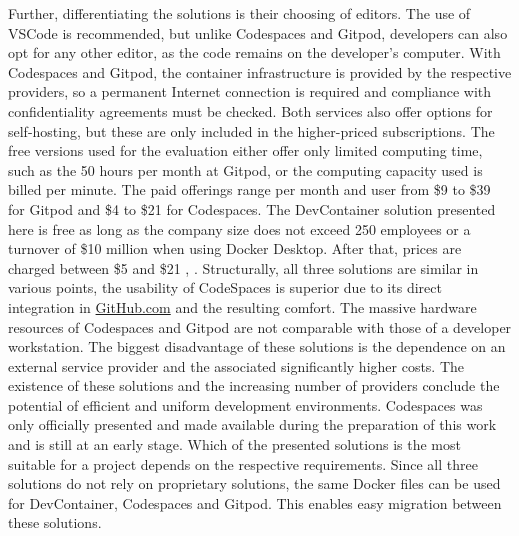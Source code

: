         Further, differentiating the solutions is their choosing of editors. The use of \ac{VSCode} is recommended, but unlike Codespaces and Gitpod, developers can also opt for any other editor, as the code remains on the developer's computer. With Codespaces and Gitpod, the container infrastructure is provided by the respective providers, so a permanent Internet connection is required and compliance with confidentiality agreements must be checked. Both services also offer options for self-hosting, but these are only included in the higher-priced subscriptions. The free versions used for the evaluation either offer only limited computing time, such as the 50 hours per month at Gitpod, or the computing capacity used is billed per minute. The paid offerings range per month and user from \$9 to \$39 for Gitpod and \$4 to \$21 for Codespaces. The DevContainer solution presented here is free as long as the company size does not exceed 250 employees or a turnover of \$10 million when using Docker Desktop. After that, prices are charged between \$5 and \$21 \cite{gitpod}, \cite{githubblogcodespace}.\newline
        Structurally, all three solutions are similar in various points, the usability of CodeSpaces is superior due to its direct integration in \href{https://www.GitHub.com}{GitHub.com} and the resulting comfort. The massive hardware resources of Codespaces and Gitpod are not comparable with those of a developer workstation. The biggest disadvantage of these solutions is the dependence on an external service provider and the associated significantly higher costs. The existence of these solutions and the increasing number of providers conclude the potential of efficient and uniform development environments. Codespaces was only officially presented and made available during the preparation of this work and is still at an early stage. Which of the presented solutions is the most suitable for a project depends on the respective requirements. Since all three solutions do not rely on proprietary solutions, the same Docker files can be used for DevContainer, Codespaces and Gitpod. This enables easy migration between these solutions.


